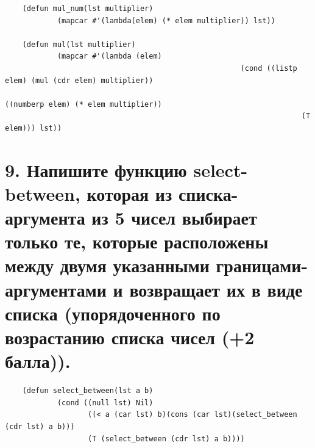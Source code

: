 \documentclass[12pt]{report}
\begin{document}
\begin{lstlisting}
	(defun mul_num(lst multiplier)
			(mapcar #'(lambda(elem) (* elem multiplier)) lst))
	
	(defun mul(lst multiplier)
			(mapcar #'(lambda (elem)
													  (cond ((listp elem) (mul (cdr elem) multiplier))
																	((numberp elem) (* elem multiplier))
																	(T elem))) lst))
\end{lstlisting}

\section*{9. Напишите функцию select-between, которая из списка-аргумента из 5 чисел выбирает только те, которые расположены между двумя указанными границами-аргументами и возвращает их в виде списка (упорядоченного по возрастанию списка чисел (+2 балла)).}

\begin{lstlisting}
	(defun select_between(lst a b)
			(cond ((null lst) Nil)
				   ((< a (car lst) b)(cons (car lst)(select_between (cdr lst) a b)))
				   (T (select_between (cdr lst) a b))))
\end{lstlisting}
\end{document}
